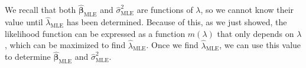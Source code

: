 \documentclass[10pt]{article}
\begin{document}
We recall that both \(\hat{\bm{\beta}}_{\mathrm{MLE}}\) and \(\hat{\sigma}^2_{\mathrm{MLE}}\) are functions of \(\lambda\), so we cannot know their value until \(\hat{\lambda}_{\mathrm{MLE}}\) has been determined.
Because of this, as we just showed, the likelihood function can be expressed as a function \(m(\lambda)\) that only depends on \(\lambda\), which can be maximized to find \(\hat{\lambda}_{\mathrm{MLE}}\). 
Once we find \(\hat{\lambda}_{\mathrm{MLE}}\), we can use this value to determine \(\hat{\bm{\beta}}_{\mathrm{MLE}}\) and \(\hat{\sigma}^2_{\mathrm{MLE}}\). 

\end{document}
